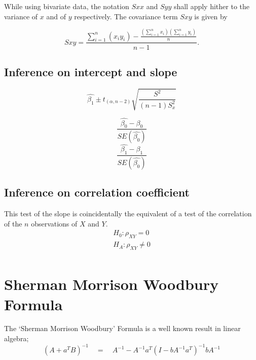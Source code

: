\documentclass[12pt, a4paper]{report}
\theoremstyle{plain}
\theoremstyle{definition}
\theoremstyle{remark}
\begin{document}
	While using bivariate data, the notation $Sxx$ and $Syy$ shall apply hither to the variance of $x$ and of $y$ respectively. The covariance term $Sxy$ is given by
	
	\begin{equation}
	Sxy=\frac{\sum_{i=1}^{n}(x_{i}y_{i})-\frac{(\sum_{i=1}^{n}x_{i})(\sum_{i=1}^{n}y_{i})}{n}}{n-1}.
	\end{equation}
	
	\subsection{Inference on intercept and slope}
	\begin{equation}
	\hat{\beta_{1}} \pm t_{(\alpha, n-2) }
	\sqrt{\frac{S^2}{(n-1)S^{2}_{x}}}
	\end{equation}
	
	\begin{equation}
	\frac{\hat{\beta_{0}}-\beta_{0}}{SE(\hat{\beta_{0}})}
	\end{equation}
	\begin{equation}
	\frac{\hat{\beta_{1}}-\beta_{1}}{SE(\hat{\beta_{0}})}
	\end{equation}
	
	
	\subsection{Inference on correlation coefficient} This test of
	the slope is coincidentally the equivalent of a test of the
	correlation of the $n$ observations of $X$ and $Y$.
	\begin{eqnarray}
	H_{0}: \rho_{XY} = 0 \nonumber \\
	H_{A}: \rho_{XY} \ne 0 \nonumber \\
	\end{eqnarray}
	
	

	\section{Sherman Morrison Woodbury Formula} %
	
	The `Sherman Morrison Woodbury' Formula is a well known result in
	linear algebra;
	\begin{equation}
	(A+a^{T}B)^{-1} \quad = \quad A^{-1}-
	A^{-1}a^{T}(I-bA^{-1}a^{T})^{-1}bA^{-1}
	\end{equation}
	
\end{document}
